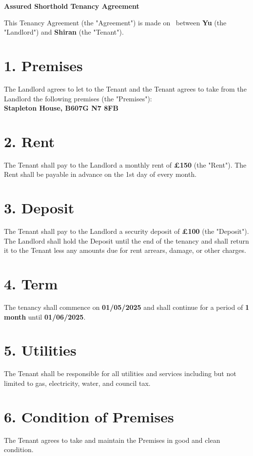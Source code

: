 \documentclass[12pt,a4paper]{article}
\newcommand{\agreementDate}{\underline{\hspace{4cm}}}
\newcommand{\landlordName}{Yu}
\newcommand{\tenantName}{Shiran}
\newcommand{\propertyAddress}{Stapleton House, B607G N7 8FB}
\newcommand{\monthlyRent}{£150}
\newcommand{\securityDeposit}{£100}
\newcommand{\startDate}{01/05/2025}
\newcommand{\tenancyEndDate}{01/06/2025}
\newcommand{\tenancyDuration}{1 month}
\begin{document}
\begin{center}
\textbf{\Large Assured Shorthold Tenancy Agreement}
\end{center}

\vspace{0.5cm}

\singlespacing

\noindent
This Tenancy Agreement (the "Agreement") is made on \agreementDate\ between \textbf{\landlordName} (the "Landlord") and \textbf{\tenantName} (the "Tenant").

\section*{1. Premises}
The Landlord agrees to let to the Tenant and the Tenant agrees to take from the Landlord the following premises (the "Premises"):\\
\textbf{\propertyAddress}

\section*{2. Rent}
The Tenant shall pay to the Landlord a monthly rent of \textbf{\monthlyRent} (the "Rent"). The Rent shall be payable in advance on the 1st day of every month.

\section*{3. Deposit}
The Tenant shall pay to the Landlord a security deposit of \textbf{\securityDeposit} (the "Deposit"). The Landlord shall hold the Deposit until the end of the tenancy and shall return it to the Tenant less any amounts due for rent arrears, damage, or other charges.

\section*{4. Term}
The tenancy shall commence on \textbf{\startDate} and shall continue for a period of \textbf{\tenancyDuration} until \textbf{\tenancyEndDate}.

\section*{5. Utilities}
The Tenant shall be responsible for all utilities and services including but not limited to gas, electricity, water, and council tax.

\section*{6. Condition of Premises}
The Tenant agrees to take and maintain the Premises in good and clean condition.
\end{document}
